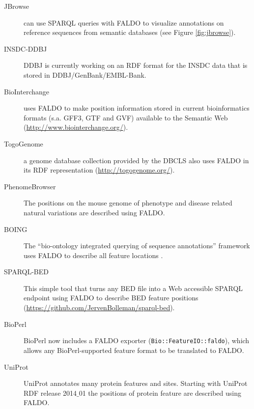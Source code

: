 \begin{description}
\item[JBrowse] can use SPARQL queries with FALDO to visualize annotations on reference sequences from semantic databases \cite{JBrowse} (see Figure \ref{fig:jbrowse}).
\item[INSDC-DDBJ] DDBJ is currently working on an RDF format for the INSDC data that is stored in DDBJ/GenBank/EMBL-Bank.
\item[BioInterchange] uses FALDO to make position information stored in current bioinformatics formats (s.a. GFF3, GTF and GVF) available to the Semantic Web (\url{http://www.biointerchange.org/}).
\item[TogoGenome] a genome database collection provided by the DBCLS also uses FALDO in its RDF representation (\url{http://togogenome.org/}).
\item[PhenomeBrowser] The positions on the mouse genome of phenotype and disease related natural variations are described using FALDO.
\item[BOING] The ``bio-ontology integrated querying of sequence annotations'' framework uses FALDO to describe all feature locations \cite{BOING}.
\item[SPARQL-BED] This simple tool that turns any BED file into a Web accessible SPARQL endpoint using FALDO to describe BED feature positions (\url{https://github.com/JervenBolleman/sparql-bed}).
\item[BioPerl] BioPerl\cite{BioPerl2002} now includes a FALDO exporter (\texttt{Bio::FeatureIO::faldo}), which allows any BioPerl-supported feature format to be translated to FALDO.
\item[UniProt] UniProt annotates many protein features and sites. Starting with UniProt RDF release 2014$\_$01 the positions of protein feature are described using FALDO.
\end{description}

